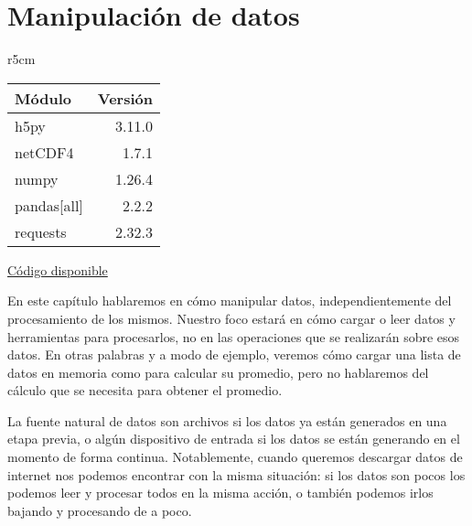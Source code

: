 

 \chapter{Manipulación de datos} \label{ch:datos}

\begin{wraptable}{r}{5cm}
\begin{modulesinfo}
\begin{center}
{\small
    \begin{tabular}{l r}
        \toprule
        \textbf{Módulo} & \textbf{Versión} \\
        \midrule
        h5py & 3.11.0 \\
        netCDF4 & 1.7.1 \\
        numpy & 1.26.4 \\
        pandas[all] & 2.2.2 \\
        requests & 2.32.3 \\
        \bottomrule
    \end{tabular}
    \vspace{0.75em}

    \href{https://github.com/facundobatista/libro-pyciencia/tree/master/código/manipulacion_datos/}{Código disponible}
}
\end{center}
\end{modulesinfo}
\end{wraptable}

En este capítulo hablaremos en cómo manipular datos, independientemente del procesamiento de los mismos. Nuestro foco estará en cómo cargar o leer datos y herramientas para procesarlos, no en las operaciones que se realizarán sobre esos datos. En otras palabras y a modo de ejemplo, veremos cómo cargar una lista de datos en memoria como para calcular su promedio, pero no hablaremos del cálculo que se necesita para obtener el promedio.

La fuente natural de datos son archivos si los datos ya están generados en una etapa previa, o algún dispositivo de entrada si los datos se están generando en el momento de forma continua. Notablemente, cuando queremos descargar datos de internet nos podemos encontrar con la misma situación: si los datos son pocos los podemos leer y procesar todos en la misma acción, o también podemos irlos bajando y procesando de a poco.

